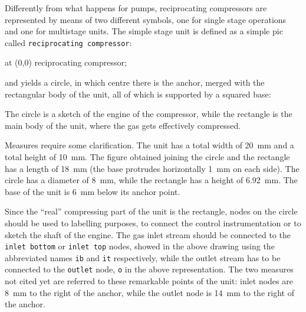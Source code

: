 \documentclass[12pt]{article}						%
\newcommand*{\chpn}[1]{\texttt{#1}}				%
\newcommand*{\chpp}[1]{\texttt{#1}}				%
\begin{document}
Differently from what happens for pumps, reciprocating compressors are
represented by means of two different symbols, one for single stage operations
and one for multistage units. The simple stage unit is defined as a simple pic
called \chpp{reciprocating compressor}:
\begin{chpcode}
	\pic at (0,0) {reciprocating compressor};
\end{chpcode}
and yields a circle, in which centre there is the anchor, merged with the
rectangular body of the unit, all of which is supported by a squared base:
\begin{center}
\end{center}
The circle is a sketch of the engine of the compressor, while the rectangle is
the main body of the unit, where the gas gets effectively compressed.

Measures require some clarification. The unit has a total width of \SI{20}{\mm}
and a total height of \SI{10}{\mm}. The figure obtained joining the circle and
the rectangle has a length of \SI{18}{\mm} (the base protrudes horizontally
\SI{1}{\mm} on each side). The circle has a diameter of \SI{8}{\mm}, while the
rectangle has a height of \SI{6.92}{\mm}. The base of the unit is \SI{6}{\mm}
below its anchor point.

Since the ``real'' compressing part of the unit is the rectangle, nodes on the
circle should be used to labelling purposes, to connect the control
instrumentation or to sketch the shaft of the engine. The gas inlet stream
should be connected to the \chpn{inlet bottom} or \chpn{inlet top} nodes, showed
in the above drawing using the abbreviated names \chpn{ib} and \chpn{it}
respectively, while the outlet stream has to be connected to the \chpn{outlet}
node, \chpn{o} in the above representation. The two measures not cited yet are
referred to these remarkable points of the unit: inlet nodes are \SI{8}{\mm} to
the right of the anchor, while the outlet node is \SI{14}{\mm} to the right of
the anchor.
\end{document}
